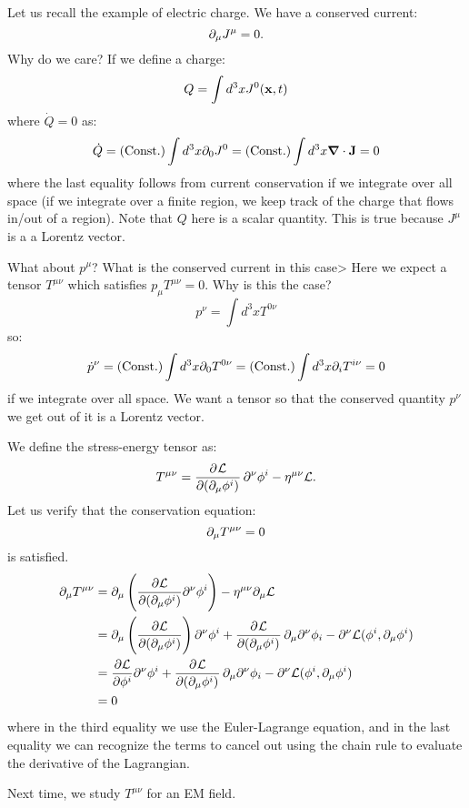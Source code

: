 Let us recall the example of electric charge. We have a conserved current:
\begin{equation}
    \partial_\mu J^\mu = 0.
\end{equation}
Why do we care? If we define a charge:
\begin{equation}
    Q = \int d^3x J^0(\mathbf{x}, t)
\end{equation}
where $\dot{Q} = 0$ as:
\begin{equation}
    \dot{Q} = (\text{Const.})\int d^3x\p_0 J^0 = (\text{Const.})\int d^3 x \nabla \cdot \v{J} = 0
\end{equation}
where the last equality follows from current conservation if we integrate over all space (if we integrate over a finite region, we keep track of the charge that flows in/out of a region). Note that $Q$ here is a scalar quantity. This is true because $J^\mu$ is a a Lorentz vector.

What about $p^\mu$? What is the conserved current in this case> Here we expect a tensor $T^{\mu\nu}$ which satisfies $p_\mu T^{\mu\nu} = 0$. Why is this the case?
\begin{equation}
    p^\nu = \int d^3x T^{0\nu}
\end{equation}
so:
\begin{equation}
    \dot{p}^\nu = (\text{Const.})\int d^3x \partial_0 T^{0\nu} = (\text{Const.})\int d^3x \partial_i T^{i\nu} = 0
\end{equation}
if we integrate over all space. We want a tensor so that the conserved quantity $p^\nu$ we get out of it is a Lorentz vector.

We define the stress-energy tensor as:
\begin{equation}
    T^{\mu\nu} = \dpd{\LL}{(\p_\mu \phi^i)}\p^\nu \phi^i - \eta^{\mu\nu}\LL.
\end{equation}
Let us verify that the conservation equation:
\begin{equation}
    \partial_\mu T^{\mu\nu} = 0
\end{equation}
is satisfied.
\begin{equation}
    \begin{split}
        \p_\mu T^{\mu\nu} &= \p_\mu\left(\ddpd{\LL}{(\p_\mu \phi^i)}\p^\nu \phi^i\right) - \eta^{\mu\nu}\p_\mu \LL
        \\ &= \p_\mu\left(\ddpd{\LL}{(\p_\mu \phi^i)}\right) \p^\nu \phi^i + \dpd{\LL}{(\p_\mu \phi^i)}\p_\mu \p^\nu \phi_i - \p^\nu \LL(\phi^i, \p_\mu \phi^i)
        \\ &= \ddpd{\LL}{\phi^i} \p^\nu \phi^i + \dpd{\LL}{(\p_\mu \phi^i)}\p_\mu \p^\nu \phi_i - \p^\nu \LL(\phi^i, \p_\mu \phi^i)
        \\ &= 0
    \end{split}
\end{equation}
where in the third equality we use the Euler-Lagrange equation, and in the last equality we can recognize the terms to cancel out using the chain rule to evaluate the derivative of the Lagrangian.

Next time, we study $T^{\mu\nu}$ for an EM field.